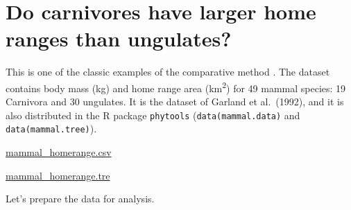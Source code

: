 \documentclass[
]{book}
\newenvironment{Shaded}{\begin{snugshade}}{\end{snugshade}}
\newcommand{\CommentTok}[1]{\textcolor[rgb]{0.56,0.35,0.01}{\textit{#1}}}
\newcommand{\FunctionTok}[1]{\textcolor[rgb]{0.13,0.29,0.53}{\textbf{#1}}}
\newcommand{\NormalTok}[1]{#1}
\newcommand{\OtherTok}[1]{\textcolor[rgb]{0.56,0.35,0.01}{#1}}
\newcommand{\SpecialCharTok}[1]{\textcolor[rgb]{0.81,0.36,0.00}{\textbf{#1}}}
\newcommand{\StringTok}[1]{\textcolor[rgb]{0.31,0.60,0.02}{#1}}
\begin{document}
\section{Do carnivores have larger home ranges than ungulates?}\label{do-carnivores-have-larger-home-ranges-than-ungulates}

This is one of the classic examples of the comparative method \citep{garland1993phylogenetic}. The dataset contains body mass (kg) and home range area (km\textsuperscript{2}) for 49 mammal species: 19 Carnivora and 30 ungulates. It is the dataset of Garland et al.~(1992), and it is also distributed in the R package \texttt{phytools} (\texttt{data(mammal.data)} and \texttt{data(mammal.tree)}).

\href{https://simjoly.github.io/ComparativeMethods-HalfDayWorkshop/data/mammal_homerange.csv}{mammal\_homerange.csv}

\href{https://simjoly.github.io/ComparativeMethods-HalfDayWorkshop/data/mammal_homerange.tre}{mammal\_homerange.tre}

Let's prepare the data for analysis.

\begin{Shaded}
\end{Shaded}
\end{document}
